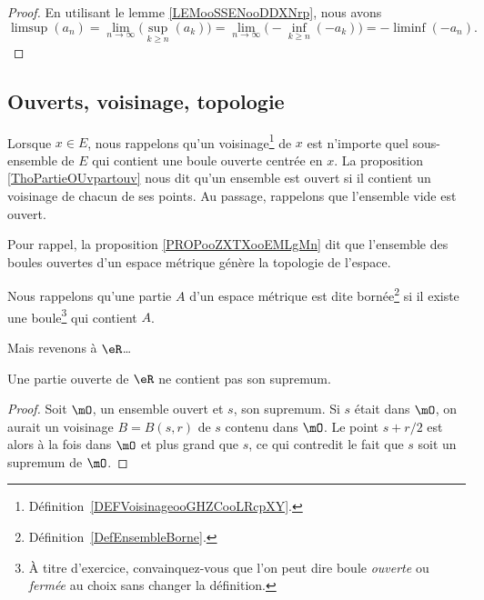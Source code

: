 \begin{proof}
    En utilisant le lemme \ref{LEMooSSENooDDXNrp}, nous avons
    \begin{equation}
        \limsup(a_n)=\lim_{n\to\infty}\Big( \sup_{k\geq n}(a_k) \Big)=\lim_{n\to \infty} \Big( -\inf_{k\geq n}(-a_k) \Big)=-\liminf(-a_n).
    \end{equation}
\end{proof}

\subsection{Ouverts, voisinage, topologie}

Lorsque \( x\in E\), nous rappelons qu'un voisinage\footnote{Définition~\ref{DEFVoisinageooGHZCooLRcpXY}.} de \( x\) est n'importe quel sous-ensemble de \( E\) qui contient une boule ouverte centrée en \( x\). La proposition \ref{ThoPartieOUvpartouv} nous dit qu'un ensemble est ouvert si il contient un voisinage de chacun de ses points. Au passage, rappelons que l'ensemble vide est ouvert.

Pour rappel, la proposition \ref{PROPooZXTXooEMLgMn} dit que l'ensemble des boules ouvertes d'un espace métrique génère la topologie de l'espace.

Nous rappelons qu'une partie \( A\) d'un espace métrique est dite bornée\footnote{Définition~\ref{DefEnsembleBorne}.} si il existe une boule\footnote{À titre d'exercice, convainquez-vous que l'on peut dire boule \emph{ouverte} ou \emph{fermée} au choix sans changer la définition.} qui contient \( A\).

Mais revenons à \( \eR \)\dots
\begin{lemma}  \label{LemSupOuvPas}
	Une partie ouverte de \( \eR\) ne contient pas son supremum.
\end{lemma}

\begin{proof}
	Soit \( \mO\), un ensemble ouvert et \( s\), son supremum. Si \( s\) était dans \( \mO\), on aurait un voisinage \( B=B(s,r)\) de \( s\) contenu dans \( \mO\). Le point \( s+r/2\) est alors à la fois dans \( \mO\) et plus grand que \( s\), ce qui contredit le fait que \( s\) soit un supremum de \( \mO\).
\end{proof}


